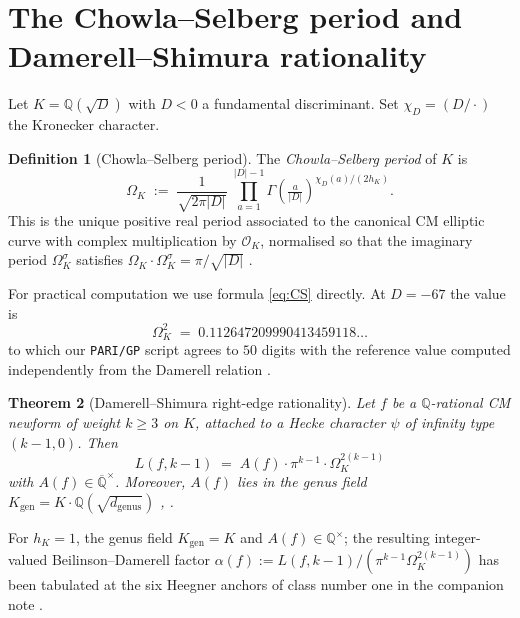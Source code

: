 \documentclass[11pt,a4paper]{amsart}
\theoremstyle{plain}
\newtheorem{theorem}{Theorem}[section]
\theoremstyle{definition}
\newtheorem{definition}[theorem]{Definition}
\newcommand{\Q}{\mathbb{Q}}
\newcommand{\OK}{\mathcal{O}_K}
\newcommand{\Kgen}{K_{\mathrm{gen}}}
\newcommand{\eqdef}{:=}
\begin{document}
\section{The Chowla--Selberg period and Damerell--Shimura rationality}\label{sec:setup}

Let $K = \Q(\sqrt{D})$ with $D < 0$ a fundamental discriminant. Set
$\chi_D = (D/\cdot)$ the Kronecker character.

\begin{definition}[Chowla--Selberg period]\label{def:CS}
The \emph{Chowla--Selberg period} of $K$ is
\begin{equation}\label{eq:CS}
  \Omega_K \;\eqdef\; \frac{1}{\sqrt{2\pi |D|}}\;
  \prod_{a=1}^{|D|-1} \Gamma\!\left(\tfrac{a}{|D|}\right)^{\chi_D(a)/(2 h_K)}.
\end{equation}
This is the unique positive real period associated to the canonical CM
elliptic curve with complex multiplication by $\OK$, normalised so that
the imaginary period $\Omega_K^\sigma$ satisfies
$\Omega_K \cdot \Omega_K^\sigma = \pi / \sqrt{|D|}$
\cite{ChowlaSelberg1949,GrossKoblitz1979}.
\end{definition}

For practical computation we use formula \eqref{eq:CS} directly. At
$D = -67$ the value is
\[
  \Omega_K^2 \;=\; 0.112647209990413459118 \dots
\]
to which our \texttt{PARI/GP} script agrees to $50$ digits with the
reference value computed independently from
the Damerell relation \cite{Damerell1971b}.

\begin{theorem}[Damerell--Shimura right-edge rationality]\label{thm:DS}
Let $f$ be a $\Q$-rational CM newform of weight $k \geq 3$ on $K$,
attached to a Hecke character $\psi$ of infinity type $(k-1, 0)$. Then
\[
  L(f, k-1) \;=\; A(f) \cdot \pi^{k-1} \cdot \Omega_K^{2(k-1)}
\]
with $A(f) \in \overline{\Q}^\times$. Moreover, $A(f)$ lies in the
genus field $\Kgen = K \cdot \Q(\sqrt{d_{\mathrm{genus}}})$
\cite[Theorem~1]{Damerell1971a},
\cite[Theorem~1 and Theorem~4]{Shimura1976}.
\end{theorem}

For $h_K = 1$, the genus field $\Kgen = K$ and $A(f) \in \Q^\times$;
the resulting integer-valued Beilinson--Damerell factor
$\alpha(f) \eqdef L(f, k-1)/(\pi^{k-1} \Omega_K^{2(k-1)})$ has been
tabulated at the six Heegner anchors of class number one in the
companion note \cite[Table~2]{Remondiere2026qD}.
\end{document}
